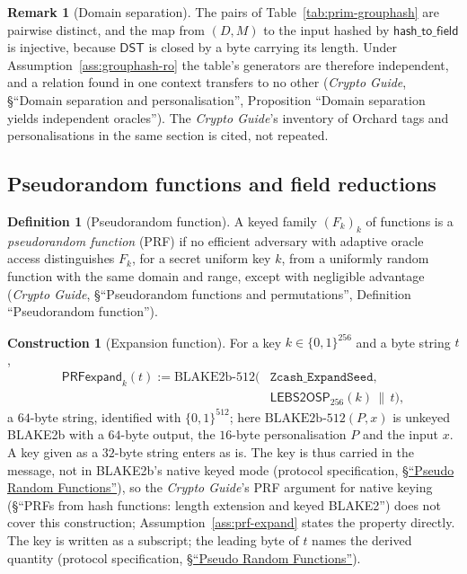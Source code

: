\documentclass[11pt,a4paper]{article}
\theoremstyle{definition}
\newtheorem{definition}[theorem]{Definition}
\newtheorem{construction}[theorem]{Construction}
\newtheorem{remark}[theorem]{Remark}
\begin{document}
\begin{remark}[Domain separation]
The pairs of Table~\ref{tab:prim-grouphash} are pairwise distinct, and the
map from $(D, M)$ to the input hashed by $\mathsf{hash\_to\_field}$ is
injective, because $\mathsf{DST}$ is closed by a byte carrying its length.
Under Assumption~\ref{ass:grouphash-ro} the table's generators are therefore
independent, and a relation found in one context transfers to no other
(\emph{Crypto Guide}, \S``Domain separation and personalisation'',
Proposition ``Domain separation yields independent oracles''). The
\emph{Crypto Guide}'s inventory of Orchard tags and personalisations in the
same section is cited, not repeated.
\end{remark}

\FloatBarrier
\subsection{Pseudorandom functions and field reductions}
\label{sec:prim-prf}

\begin{definition}[Pseudorandom function]
A keyed family $(F_k)_k$ of functions is a \emph{pseudorandom function}
(PRF) if no efficient adversary with adaptive oracle access distinguishes
$F_k$, for a secret uniform key $k$, from a uniformly random function with
the same domain and range, except with negligible advantage (\emph{Crypto
Guide}, \S``Pseudorandom functions and permutations'', Definition
``Pseudorandom function'').
\end{definition}

\begin{construction}[Expansion function]
For a key $k \in \{0,1\}^{256}$ and a byte string $t$,
\begin{align*}
  \mathsf{PRFexpand}_k(t) := \mathrm{BLAKE2b\text{-}512}\bigl(
    &\texttt{Zcash\_ExpandSeed}, \\
    &\mathsf{LEBS2OSP}_{256}(k) \,\|\, t\bigr),
\end{align*}
a $64$-byte string, identified with $\{0,1\}^{512}$; here
$\mathrm{BLAKE2b\text{-}512}(P, x)$ is unkeyed BLAKE2b with a $64$-byte
output, the $16$-byte personalisation $P$ and the input $x$. A key given as
a $32$-byte string enters as is. The key is thus carried in the message, not
in BLAKE2b's native keyed mode (protocol specification,
\href{https://zips.z.cash/protocol/protocol.pdf#concreteprfs}%
{\S``Pseudo Random Functions''}), so the \emph{Crypto Guide}'s PRF argument
for native keying
(\S``PRFs from hash functions: length extension and keyed BLAKE2'') does not
cover this construction; Assumption~\ref{ass:prf-expand} states the
property directly. The key is written as a subscript; the
leading byte of $t$ names the derived quantity (protocol specification,
\href{https://zips.z.cash/protocol/protocol.pdf#abstractprfs}%
{\S``Pseudo Random Functions''}).
\end{construction}
\end{document}
